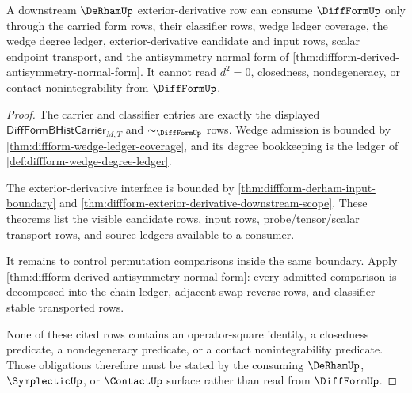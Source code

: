 \begin{theorem}
\label{thm:diffform-derham-boundary-consumption}
A downstream $\DeRhamUp$ exterior-derivative row can consume $\DiffFormUp$ only
through the carried form rows, their classifier rows, wedge ledger coverage,
the wedge degree ledger, exterior-derivative candidate and input rows, scalar
endpoint transport, and the antisymmetry normal form of
\autoref{thm:diffform-derived-antisymmetry-normal-form}. It cannot read
$d^2=0$, closedness, nondegeneracy, or contact nonintegrability from
$\DiffFormUp$.
\end{theorem}
\begin{proof}
The carrier and classifier entries are exactly the displayed
$\mathsf{DiffFormBHistCarrier}_{M,T}$ and $\sim_{\DiffFormUp}$ rows. Wedge
admission is bounded by \autoref{thm:diffform-wedge-ledger-coverage}, and its
degree bookkeeping is the ledger of
\autoref{def:diffform-wedge-degree-ledger}.

The exterior-derivative interface is bounded by
\autoref{thm:diffform-derham-input-boundary} and
\autoref{thm:diffform-exterior-derivative-downstream-scope}. These theorems
list the visible candidate rows, input rows, probe/tensor/scalar transport
rows, and source ledgers available to a consumer.

It remains to control permutation comparisons inside the same boundary.
Apply \autoref{thm:diffform-derived-antisymmetry-normal-form}: every admitted
comparison is decomposed into the chain ledger, adjacent-swap reverse rows, and
classifier-stable transported rows.

None of these cited rows contains an operator-square identity, a closedness
predicate, a nondegeneracy predicate, or a contact nonintegrability predicate.
Those obligations therefore must be stated by the consuming $\DeRhamUp$,
$\SymplecticUp$, or $\ContactUp$ surface rather than read from $\DiffFormUp$.
\end{proof}

